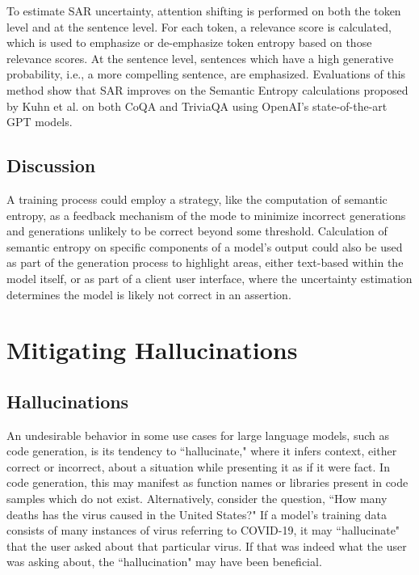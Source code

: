 \documentclass[letterpaper,12pt]{article}
\begin{document}
To estimate SAR uncertainty, attention shifting is performed on both the token level and at the sentence level. For each token, a relevance score is calculated, which is used to emphasize or de-emphasize token entropy based on those relevance scores. At the sentence level, sentences which have a high generative probability, i.e., a more compelling sentence, are emphasized. Evaluations of this method show that SAR improves on the Semantic Entropy calculations proposed by Kuhn et al. on both CoQA and TriviaQA using OpenAI's state-of-the-art GPT models.

\subsection{Discussion}

A training process could employ a strategy, like the computation of semantic entropy, as a feedback mechanism of the mode to minimize incorrect generations and generations unlikely to be correct beyond some threshold. Calculation of semantic entropy on specific components of a model's output could also be used as part of the generation process to highlight areas, either text-based within the model itself, or as part of a client user interface, where the uncertainty estimation determines the model is likely not correct in an assertion.

\section{Mitigating Hallucinations}
\subsection{Hallucinations}
An undesirable behavior in some use cases for large language models, such as code generation, is its tendency to ``hallucinate," where it infers context, either correct or incorrect, about a situation while presenting it as if it were fact. In code generation, this may manifest as function names or libraries present in code samples which do not exist. Alternatively, consider the question, ``How many deaths has the virus caused in the United States?" If a model's training data consists of many instances of virus referring to COVID-19, it may ``hallucinate" that the user asked about that particular virus. If that was indeed what the user was asking about, the ``hallucination" may have been beneficial.
\end{document}
